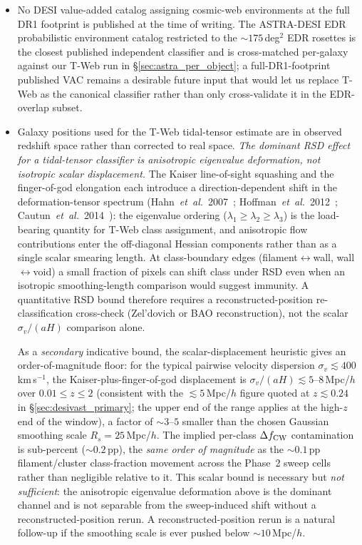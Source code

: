 \documentclass[aps,prd,twocolumn,superscriptaddress,showpacs,preprintnumbers,nofootinbib,longbibliography,floatfix]{revtex4-2}
\begin{document}
\begin{itemize}
in Paper~IV (per-leg $|\sigma|\!<\!3$); we propagate the per-leg split
here but do not re-derive the underlying bias.
\item No DESI value-added catalog assigning cosmic-web environments
at the full DR1 footprint is published at the time of writing.
The ASTRA-DESI EDR probabilistic environment catalog
\cite{ASTRADESI2026} restricted to the $\sim\!175$\,deg$^2$ EDR
rosettes is the closest published independent classifier and is
cross-matched per-galaxy against our T-Web run in
\S\ref{sec:astra_per_object}; a full-DR1-footprint published VAC
remains a desirable future input that would let us replace T-Web as
the canonical classifier rather than only cross-validate it in
the EDR-overlap subset.
\item Galaxy positions used for the T-Web tidal-tensor estimate are
in observed redshift space rather than corrected to real space.
\emph{The dominant RSD effect for a tidal-tensor classifier is
anisotropic eigenvalue deformation, not isotropic scalar displacement.}
The Kaiser
line-of-sight squashing and the finger-of-god elongation each
introduce a direction-dependent shift in the deformation-tensor
spectrum
(Hahn~\textit{et~al.}~2007~\cite{Hahn2007};
Hoffman~\textit{et~al.}~2012~\cite{Hoffman2012};
Cautun~\textit{et~al.}~2014~\cite{Cautun2014}): the eigenvalue
ordering ($\lambda_1 \ge \lambda_2 \ge \lambda_3$) is the
load-bearing quantity for T-Web class assignment, and anisotropic
flow contributions enter the off-diagonal Hessian components rather
than as a single scalar smearing length. At class-boundary edges
(filament$\leftrightarrow$wall, wall$\leftrightarrow$void) a small
fraction of pixels can shift class under RSD even when an isotropic
smoothing-length comparison would suggest immunity. A quantitative
RSD bound therefore requires a reconstructed-position re-classification
cross-check (Zel'dovich or BAO reconstruction), not the scalar
$\sigma_v/(aH)$ comparison alone.

As a \emph{secondary} indicative bound, the scalar-displacement
heuristic gives an order-of-magnitude floor: for the typical
pairwise velocity dispersion $\sigma_v \lesssim 400$\,km\,s$^{-1}$,
the Kaiser-plus-finger-of-god displacement is
$\sigma_v/(aH) \lesssim 5$--$8$\,Mpc/$h$ over $0.01 \le z \le 2$
(consistent with the $\lesssim 5$\,Mpc/$h$ figure quoted at
$z \lesssim 0.24$ in \S\ref{sec:desivast_primary}; the upper end of
the range applies at the high-$z$ end of the window),
a factor of $\sim 3$--$5$ smaller than the chosen Gaussian smoothing
scale $R_s = 25$\,Mpc/$h$. The implied per-class $\Delta f_{\rm CW}$
contamination is sub-percent ($\sim 0.2$\,pp), the
\emph{same order of magnitude} as the ${\sim}0.1$\,pp
filament/cluster class-fraction movement across the Phase~2 sweep
cells rather than negligible relative to it. This scalar bound is
necessary but \emph{not sufficient}: the anisotropic eigenvalue
deformation above is the dominant channel and is not separable from
the sweep-induced shift without a reconstructed-position rerun.
A reconstructed-position rerun is a natural follow-up if the smoothing
scale is ever pushed below $\sim 10$\,Mpc/$h$.


\end{itemize}
\end{document}
